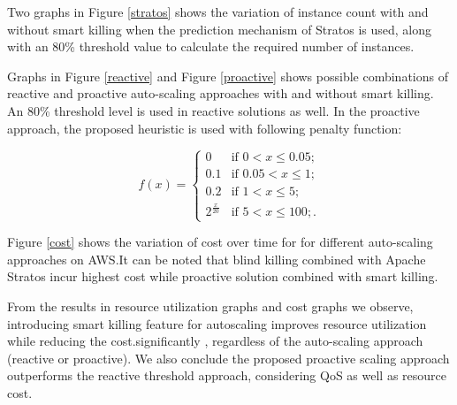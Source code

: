 Two graphs in Figure \ref{stratos} shows the variation of instance count with and without smart killing when the prediction mechanism of Stratos is used, along with an 80\% threshold value to calculate the required number of instances.

Graphs in Figure \ref{reactive} and Figure \ref{proactive} shows possible combinations of reactive and proactive auto-scaling approaches with and without smart killing. An 80\% threshold level is used in reactive solutions as well. In the proactive approach, the proposed heuristic is used with following penalty function:

$$f(x) = \begin{cases} 
0 & \text{if $0 < x \le 0.05$}; \\
0.1 & \text{if $0.05 < x \le 1$}; \\
0.2 & \text{if $1 < x \le 5$};\\
2^{\frac{x}{20}} & \text{if $5 < x \le 100$};.\end{cases} $$


Figure \ref{cost} shows the variation of cost over time for for different auto-scaling approaches on AWS.It can be noted that blind killing combined with Apache Stratos incur highest cost while proactive solution combined with smart killing.

From the results in resource utilization graphs and cost graphs we observe, introducing smart killing feature for autoscaling improves resource utilization while reducing the cost.significantly , regardless of the auto-scaling approach (reactive or proactive). We also conclude the proposed proactive scaling approach outperforms the reactive threshold approach, considering QoS as well as resource cost.